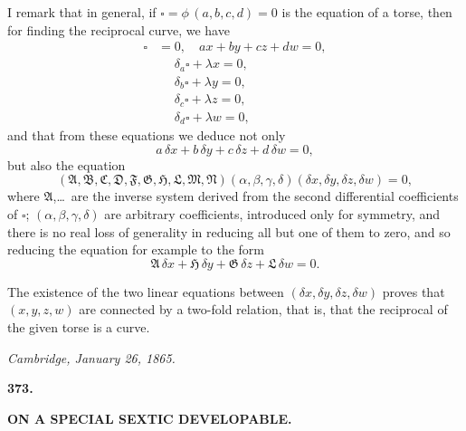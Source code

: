\documentclass[11pt,a4paper]{article}
\begin{document}
\noindent
I remark that in general, if $\square = \phi\,(a, b, c, d) = 0$ is the equation of a torse, then for finding the reciprocal curve, we have
\begin{align*}
\square &= 0,\quad ax + by + cz + dw = 0,\\
&\phantom{=}\delta_{a}\square + \lambda x = 0,\\
&\phantom{=}\delta_{b}\square + \lambda y = 0,\\
&\phantom{=}\delta_{c}\square + \lambda z = 0,\\
&\phantom{=}\delta_{d}\square + \lambda w = 0,
\end{align*}
and that from these equations we deduce not only
\[
a\,\delta x + b\,\delta y + c\,\delta z + d\,\delta w = 0,
\]
but also the equation
\[
(\mathfrak{A}, \mathfrak{B}, \mathfrak{C}, \mathfrak{D}, \mathfrak{F}, \mathfrak{G}, \mathfrak{H}, \mathfrak{L}, \mathfrak{M}, \mathfrak{N})(\alpha, \beta, \gamma, \delta)(\delta x, \delta y, \delta z, \delta w) = 0,
\]
where $\mathfrak{A}$,\ldots\ are the inverse system derived from the second differential coefficients of $\square$; $(\alpha, \beta, \gamma, \delta)$ are arbitrary coefficients, introduced only for symmetry, and there is no real loss of generality in reducing all but one of them to zero, and so reducing the equation for example to the form
\[
\mathfrak{A}\,\delta x + \mathfrak{H}\,\delta y + \mathfrak{G}\,\delta z + \mathfrak{L}\,\delta w = 0.
\]

The existence of the two linear equations between $(\delta x, \delta y, \delta z, \delta w)$ proves that $(x, y, z, w)$ are connected by a two-fold relation, that is, that the reciprocal of the given torse is a curve.

\begin{flushright}
\textit{Cambridge, January 26, 1865.}
\end{flushright}

\vspace{24pt}



\newpage
\begin{center}
\textbf{373.}
\end{center}
\vspace{-8pt}

\begin{center}
\textbf{ON A SPECIAL SEXTIC DEVELOPABLE.}
\end{center}
\end{document}
